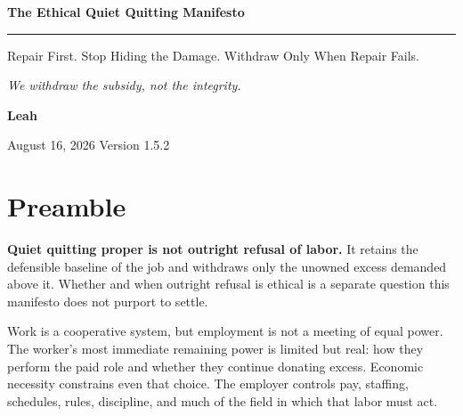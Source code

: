 \documentclass[11pt,oneside]{article}
\begin{document}
\hypersetup{pageanchor=false}

\begin{titlepage}
\thispagestyle{empty}
\vspace*{0.9in}

{\sffamily\bfseries\fontsize{31}{36}\selectfont\color{ManifestInk}
The Ethical Quiet Quitting Manifesto\par}

\vspace{0.5em}
{\color{ManifestRule}\rule{\textwidth}{1.2pt}}
\vspace{1.0em}

{\sffamily\fontsize{17}{23}\selectfont\color{ManifestGray}
Repair First. Stop Hiding the Damage. Withdraw Only When Repair
Fails.\par}

\vfill

\begin{tcolorbox}[
  enhanced,
  colback=ManifestLight,
  colframe=ManifestRule,
  boxrule=0pt,
  leftrule=4pt,
  arc=0pt,
  left=14pt,right=14pt,top=13pt,bottom=13pt
]
{\Large\itshape We withdraw the subsidy, not the integrity.}
\end{tcolorbox}
\vfill

{\sffamily\large\bfseries Leah\par}
\vspace{0.2em}
{\sffamily\color{ManifestGray}August 16, 2026 \quad Version 1.5.2\par}
\vspace{0.55in}
\end{titlepage}

\thispagestyle{plain}
\tableofcontents
\clearpage
{}
\hypersetup{pageanchor=true}

\hypertarget{preamble}{%
\section{Preamble}\label{preamble}}

\textbf{Quiet quitting proper is not outright refusal of labor.} It
retains the defensible baseline of the job and withdraws only the
unowned excess demanded above it. Whether and when outright refusal is
ethical is a separate question this manifesto does not purport to
settle.

Work is a cooperative system, but employment is not a meeting of equal
power. The worker's most immediate remaining power is limited but real:
how they perform the paid role and whether they continue donating
excess. Economic necessity constrains even that choice. The employer
controls pay, staffing, schedules, rules, discipline, and much of the
field in which that labor must act.
\end{document}
